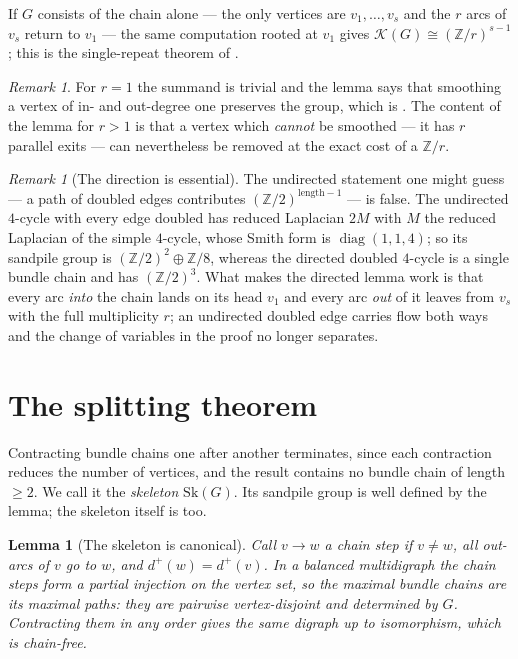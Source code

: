\documentclass[11pt]{article}
\theoremstyle{plain}
\newtheorem{lemma}[theorem]{Lemma}
\theoremstyle{definition}
\theoremstyle{remark}
\newtheorem{remark}[theorem]{Remark}
\newcommand{\Z}{\mathbb{Z}}
\newcommand{\K}{\mathcal{K}}
\newcommand{\Sk}{\mathrm{Sk}}
\begin{document}
If $G$ consists of the chain alone --- the only vertices are $v_1,\dots,v_s$ and the $r$
arcs of $v_s$ return to $v_1$ --- the same computation rooted at $v_1$ gives
$\K(G)\cong(\Z/r)^{s-1}$; this is the single-repeat theorem of \cite[Thm.~5]{Bio1}.

\begin{remark}\label{rem:r1}
For $r=1$ the summand is trivial and the lemma says that smoothing a vertex of in- and
out-degree one preserves the group, which is \cite[Lem.~4]{Bio1}. The content of the
lemma for $r>1$ is that a vertex which \emph{cannot} be smoothed --- it has $r$ parallel
exits --- can nevertheless be removed at the exact cost of a $\Z/r$.
\end{remark}

\begin{remark}[The direction is essential]\label{rem:undirected}
The undirected statement one might guess --- a path of doubled edges contributes
$(\Z/2)^{\text{length}-1}$ --- is false. The undirected $4$-cycle with every edge doubled
has reduced Laplacian $2M$ with $M$ the reduced Laplacian of the simple $4$-cycle, whose
Smith form is $\operatorname{diag}(1,1,4)$; so its sandpile group is
$(\Z/2)^{2}\oplus\Z/8$, whereas the directed doubled $4$-cycle is a single bundle chain and
has $(\Z/2)^{3}$. What makes the directed lemma work is that every arc \emph{into} the
chain lands on its head $v_1$ and every arc \emph{out} of it leaves from $v_s$ with the
full multiplicity $r$; an undirected doubled edge carries flow both ways and the change
of variables in the proof no longer separates.
\end{remark}

\section{The splitting theorem}\label{sec:split}

Contracting bundle chains one after another terminates, since each contraction reduces
the number of vertices, and the result contains no bundle chain of length $\ge2$. We call
it the \emph{skeleton} $\Sk(G)$. Its sandpile group is well defined by the lemma; the
skeleton itself is too.

\begin{lemma}[The skeleton is canonical]\label{lem:canon}
Call $v\to w$ a \emph{chain step} if $v\ne w$, all out-arcs of $v$ go to $w$, and
$d^+(w)=d^+(v)$. In a balanced multidigraph the chain steps form a partial injection on
the vertex set, so the maximal bundle chains are its maximal paths: they are pairwise
vertex-disjoint and determined by $G$. Contracting them in any order gives the same
digraph up to isomorphism, which is chain-free.
\end{lemma}
\end{document}
